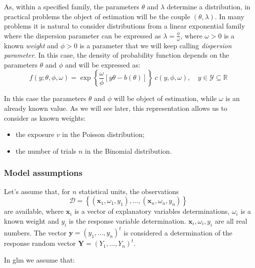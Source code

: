 \documentclass[a4paper, twoside, openright, 12pt]{report}
\providecommand{\tightlist}{%
  \setlength{\itemsep}{0pt}\setlength{\parskip}{0pt}}
\theoremstyle{definition}
\theoremstyle{definition}
\theoremstyle{definition}
\theoremstyle{remark}
\begin{document}
As, within a specified family, the parameters \(\theta\) and \(\lambda\) determine a distribution, in practical problems the object of estimation will be the couple \((\theta, \lambda)\). In many problems it is natural to consider distributions from a linear exponential family where the dispersion parameter can be expressed as \(\lambda = \frac{\phi}{\omega}\), where \(\omega>0\) is a known \emph{weight} and \(\phi>0\) is a parameter that we will keep calling \emph{dispersion parameter}. In this case, the density of probability function depends on the parameters \(\theta\) and \(\phi\) and will be expressed as:
\[
f(y; \theta, \phi, \omega) = \exp{\left\{ \frac{\omega}{\phi} \left[y\theta - b(\theta) \right] \right\}} \ c(y, \phi, \omega), \quad y\in \mathcal{Y}\subseteq\mathbb{R}
\]

In this case the parameters \(\theta\) and \(\phi\) will be object of estimation, while \(\omega\) is an already known value. As we will see later, this representation allows us to consider as known weights:

\begin{itemize}
\tightlist
\item
  the exposure \(v\) in the Poisson distribution;
\item
  the number of trials \(n\) in the Binomial distribution.
\end{itemize}

\hypertarget{chap:glm-assumptions}{%
\subsubsection{Model assumptions}\label{chap:glm-assumptions}}

Let's assume that, for \(n\) statistical units, the observations
\[\mathcal{D} = \left\{ (\boldsymbol{x}_1, \omega_1, y_1), \dots,  (\boldsymbol{x}_n, \omega_n, y_n) \right\}\]
are available, where \(\boldsymbol{x}_i\) is a vector of explanatory variables determinations, \(\omega_i\) is a known weight and \(y_i\) is the response variable determination. \(\boldsymbol{x}_i, \omega_i, y_i\) are all real numbers. The vector \(\boldsymbol{y} = (y_1, \dots, y_n)^t\) is considered a determination of the response random vector \(\boldsymbol{Y} = (Y_1, \dots, Y_n)^t\).

In \ac{glm} we assume that:
\end{document}
